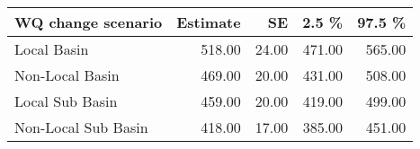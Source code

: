 \begin{table}[ht]
\centering
\begin{tabular}{lrrrr}
  \hline
WQ change scenario & Estimate & SE & 2.5 \% & 97.5 \% \\ 
  \hline
Local Basin & 518.00 & 24.00 & 471.00 & 565.00 \\ 
  Non-Local Basin & 469.00 & 20.00 & 431.00 & 508.00 \\ 
  Local Sub Basin & 459.00 & 20.00 & 419.00 & 499.00 \\ 
  Non-Local  Sub Basin & 418.00 & 17.00 & 385.00 & 451.00 \\ 
   \hline
\end{tabular}
\end{table}
